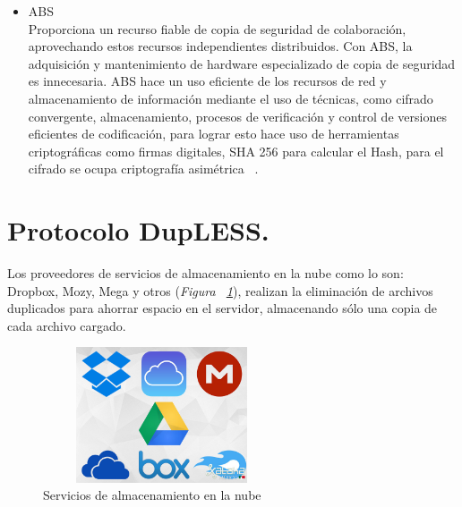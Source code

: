 \begin{itemize}

\item ABS\\

Proporciona un recurso fiable de copia de seguridad de colaboración, aprovechando estos recursos independientes distribuidos. Con ABS, la adquisición y mantenimiento de hardware especializado de copia de seguridad es innecesaria. ABS hace un uso eficiente de los recursos de red y almacenamiento de información mediante el uso de técnicas, como cifrado convergente, almacenamiento, procesos de verificación y control de versiones eficientes de codificación, para lograr esto hace uso de herramientas criptográficas como firmas digitales, SHA 256 para calcular el Hash, para el cifrado se ocupa criptografía asimétrica ~\cite{abs}.

\end{itemize}



\section{Protocolo DupLESS. }
Los proveedores de servicios de almacenamiento en la nube como lo son: Dropbox, Mozy, Mega y otros (\textit{Figura ~\ref{fig:3-1-0}}), realizan la eliminación de archivos duplicados para ahorrar espacio en el servidor, almacenando sólo una copia de cada archivo cargado. \\

\begin{figure}[H]
\centering
\includegraphics[width=7cm, height=4cm]{./images/servicios_nube.jpg}
\caption{Servicios de almacenamiento en la nube}
\label{fig:3-1-0}
\end{figure}


